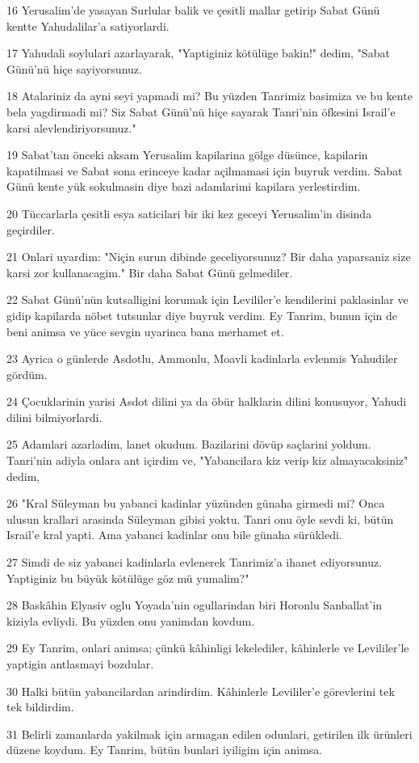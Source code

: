 \par 16 Yerusalim'de yasayan Surlular balik ve çesitli mallar getirip Sabat Günü kentte Yahudalilar'a satiyorlardi.
\par 17 Yahudali soylulari azarlayarak, "Yaptiginiz kötülüge bakin!" dedim, "Sabat Günü'nü hiçe sayiyorsunuz.
\par 18 Atalariniz da ayni seyi yapmadi mi? Bu yüzden Tanrimiz basimiza ve bu kente bela yagdirmadi mi? Siz Sabat Günü'nü hiçe sayarak Tanri'nin öfkesini Israil'e karsi alevlendiriyorsunuz."
\par 19 Sabat'tan önceki aksam Yerusalim kapilarina gölge düsünce, kapilarin kapatilmasi ve Sabat sona erinceye kadar açilmamasi için buyruk verdim. Sabat Günü kente yük sokulmasin diye bazi adamlarimi kapilara yerlestirdim.
\par 20 Tüccarlarla çesitli esya saticilari bir iki kez geceyi Yerusalim'in disinda geçirdiler.
\par 21 Onlari uyardim: "Niçin surun dibinde geceliyorsunuz? Bir daha yaparsaniz size karsi zor kullanacagim." Bir daha Sabat Günü gelmediler.
\par 22 Sabat Günü'nün kutsalligini korumak için Levililer'e kendilerini paklasinlar ve gidip kapilarda nöbet tutsunlar diye buyruk verdim. Ey Tanrim, bunun için de beni animsa ve yüce sevgin uyarinca bana merhamet et.
\par 23 Ayrica o günlerde Asdotlu, Ammonlu, Moavli kadinlarla evlenmis Yahudiler gördüm.
\par 24 Çocuklarinin yarisi Asdot dilini ya da öbür halklarin dilini konusuyor, Yahudi dilini bilmiyorlardi.
\par 25 Adamlari azarladim, lanet okudum. Bazilarini dövüp saçlarini yoldum. Tanri'nin adiyla onlara ant içirdim ve, "Yabancilara kiz verip kiz almayacaksiniz" dedim,
\par 26 "Kral Süleyman bu yabanci kadinlar yüzünden günaha girmedi mi? Onca ulusun krallari arasinda Süleyman gibisi yoktu. Tanri onu öyle sevdi ki, bütün Israil'e kral yapti. Ama yabanci kadinlar onu bile günaha sürükledi.
\par 27 Simdi de siz yabanci kadinlarla evlenerek Tanrimiz'a ihanet ediyorsunuz. Yaptiginiz bu büyük kötülüge göz mü yumalim?"
\par 28 Baskâhin Elyasiv oglu Yoyada'nin ogullarindan biri Horonlu Sanballat'in kiziyla evliydi. Bu yüzden onu yanimdan kovdum.
\par 29 Ey Tanrim, onlari animsa; çünkü kâhinligi lekelediler, kâhinlerle ve Levililer'le yaptigin antlasmayi bozdular.
\par 30 Halki bütün yabancilardan arindirdim. Kâhinlerle Levililer'e görevlerini tek tek bildirdim.
\par 31 Belirli zamanlarda yakilmak için armagan edilen odunlari, getirilen ilk ürünleri düzene koydum. Ey Tanrim, bütün bunlari iyiligim için animsa.


